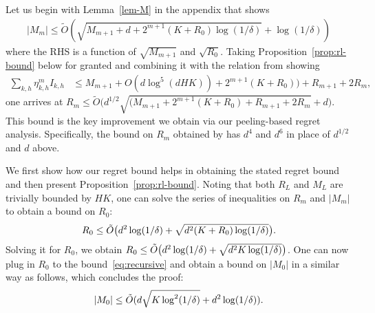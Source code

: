 \documentclass{article}
\begin{document}
Let us begin with Lemma~\ref{lem-M} in the appendix that shows
\begin{align}\label{eq:recursive}
 |M_m| \le \tilde O(\sqrt{M_{m+1}+ d +2^{m+1}(K\!+\!R_0)\log(1/\delta)}+\log(1/\delta))
\end{align}
where the RHS is a function of $\sqrt{M_{m+1}}$ and $\sqrt{R_0}$. 
Taking Proposition~\ref{prop:rl-bound} below for granted and combining it with the relation from \citet[Eq. (57)]{zhang21variance} showing 
\begin{align*}
    \sum_{k,h} \eta^m_{k,h} I_{k,h} &\le M_{m+1}+O(d\log^5(dHK))+2^{m+1}(K+R_0))+R_{m+1}+2R_m,    
\end{align*} 
one arrives at
$
    R_m\le \tilde O\big(d^{1/2}\!\!   \sqrt{(M_{m+1}\!+\!2^{m+1}(K\!+\!R_0)\!+\!R_{m+1}+2R_m}\!+\!d  )
$.
This bound is the key improvement we obtain via our peeling-based regret analysis.
Specifically, the bound on $R_m$ obtained by \cite{zhang21variance} has $d^4$ and $d^6$ in place of $d^{1/2}$ and $d$ above.

We first show how our regret bound helps in obtaining the stated regret bound and then present Proposition~\ref{prop:rl-bound}.
Noting that both $R_{L}$ and $M_{L}$ are trivially bounded by $HK$, one can solve the series of inequalities on $R_m$ and $|M_m|$ to obtain a bound on $R_0$:
\begin{align}%
    R_0 \le \tilde O\big(d^2\log (1/\dt)+\sqrt{d^2(K+R_0)\log(1/\dt)}\big).
\end{align}
Solving it for $R_0$, we obtain $
    R_0\le \tilde O\big(d^2\log (1/{\delta})+\sqrt{d^2K\log(1/{\delta})}\big)
$.
One can now plug in $R_0$ to the bound~\eqref{eq:recursive} and obtain a bound on $|M_0|$ in a similar way as follows, which concludes the proof:
$$
|M_0|\le \tilde O(d\sqrt{K\log^2(1/{\delta})}+d^{2}\log(1/{\delta})).
$$
\end{document}
